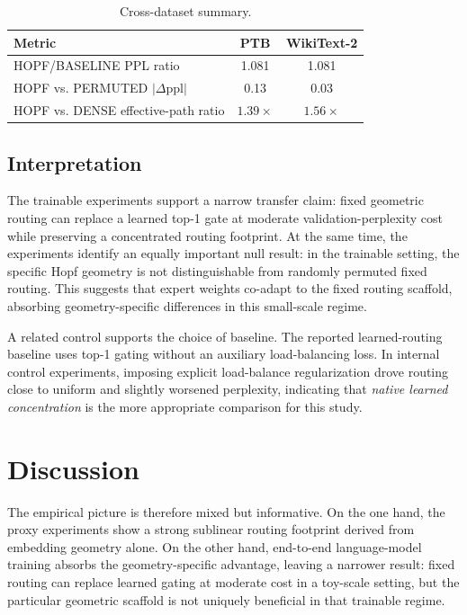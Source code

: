 \documentclass[10pt,twocolumn]{article}
\begin{document}
\begin{table}[t]
\centering
\caption{Cross-dataset summary.}
\label{tab:crossdataset}
\small
\begin{tabular}{lcc}
\toprule
Metric & PTB & WikiText-2 \\
\midrule
HOPF/BASELINE PPL ratio & 1.081 & 1.081 \\
HOPF vs. PERMUTED $|\Delta \mathrm{ppl}|$ & 0.13 & 0.03 \\
HOPF vs. DENSE effective-path ratio & $1.39\times$ & $1.56\times$ \\
\bottomrule
\end{tabular}
\end{table}

\subsection{Interpretation}
The trainable experiments support a narrow transfer claim: fixed geometric routing can replace a learned top-1 gate at moderate validation-perplexity cost while preserving a concentrated routing footprint. At the same time, the experiments identify an equally important null result: in the trainable setting, the specific Hopf geometry is not distinguishable from randomly permuted fixed routing. This suggests that expert weights co-adapt to the fixed routing scaffold, absorbing geometry-specific differences in this small-scale regime.

A related control supports the choice of baseline. The reported learned-routing baseline uses top-1 gating without an auxiliary load-balancing loss. In internal control experiments, imposing explicit load-balance regularization drove routing close to uniform and slightly worsened perplexity, indicating that \emph{native learned concentration} is the more appropriate comparison for this study.

\section{Discussion}
The empirical picture is therefore mixed but informative. On the one hand, the proxy experiments show a strong sublinear routing footprint derived from embedding geometry alone. On the other hand, end-to-end language-model training absorbs the geometry-specific advantage, leaving a narrower result: fixed routing can replace learned gating at moderate cost in a toy-scale setting, but the particular geometric scaffold is not uniquely beneficial in that trainable regime.
\end{document}
